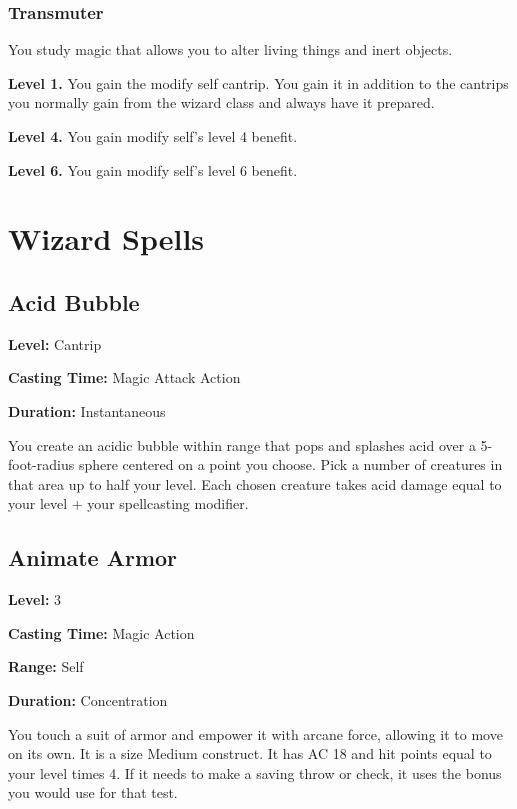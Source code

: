 \documentclass[12pt,letterpaper,twocolumn,openany,nodeprecatedcode,bg=none]{dndbook}
\begin{document}
\subsubsection{Transmuter}\label{transmuter}

You study magic that allows you to alter living things and inert
objects.

\textbf{Level 1.} You gain the modify self cantrip. You gain it in
addition to the cantrips you normally gain from the wizard class and
always have it prepared.

\textbf{Level 4.} You gain modify self's level 4 benefit.

\textbf{Level 6.} You gain modify self's level 6 benefit.

\clearpage

\section{Wizard Spells}\label{wizard-spells}

\subsection{Acid Bubble}\label{acid-bubble}

\textbf{Level:} Cantrip

\textbf{Casting Time:} Magic Attack Action

\textbf{Duration:} Instantaneous

You create an acidic bubble within range that pops and splashes acid
over a 5-foot-radius sphere centered on a point you choose. Pick a
number of creatures in that area up to half your level. Each chosen
creature takes acid damage equal to your level + your spellcasting
modifier.

\subsection{Animate Armor}\label{animate-armor}

\textbf{Level:} 3

\textbf{Casting Time:} Magic Action

\textbf{Range:} Self

\textbf{Duration:} Concentration

You touch a suit of armor and empower it with arcane force, allowing it
to move on its own. It is a size Medium construct. It has AC 18 and hit
points equal to your level times 4. If it needs to make a saving throw
or check, it uses the bonus you would use for that test.
\end{document}
